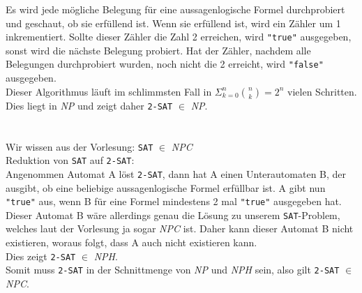 \documentclass{article}
\begin{document}
Es wird jede mögliche Belegung für eine aussagenlogische Formel durchprobiert und geschaut, ob sie erfüllend ist.
Wenn sie erfüllend ist, wird ein Zähler um 1 inkrementiert.
Sollte dieser Zähler die Zahl 2 erreichen, wird \texttt{"true"} ausgegeben, sonst wird die nächste Belegung probiert.
Hat der Zähler, nachdem alle Belegungen durchprobiert wurden, noch nicht die 2 erreicht, wird \texttt{"false"} ausgegeben.\\
Dieser Algorithmus läuft im schlimmsten Fall in $\Sigma ^n_{k=0} \binom{n}{k} = 2^n$ vielen Schritten.\\
Dies liegt in \textit{NP} und zeigt daher \texttt{2-SAT} $\in$ \textit{NP}.\\
\\
\\
Wir wissen aus der Vorlesung: \texttt{SAT} $\in$ \textit{NPC}\\
Reduktion von \texttt{SAT} auf \texttt{2-SAT}:\\
Angenommen Automat A löst \texttt{2-SAT}, dann hat A einen Unterautomaten B, der ausgibt, ob eine beliebige aussagenlogische Formel erfüllbar ist.
A gibt nun \texttt{"true"} aus, wenn B für eine Formel mindestens 2 mal \texttt{"true"} ausgegeben hat.\\
Dieser Automat B wäre allerdings genau die Lösung zu unserem \texttt{SAT}-Problem, welches laut der Vorlesung ja sogar \textit{NPC} ist.
Daher kann dieser Automat B nicht existieren, woraus folgt, dass A auch nicht existieren kann.\\
Dies zeigt \texttt{2-SAT} $\in$ \textit{NPH}.\\
Somit muss \texttt{2-SAT} in der Schnittmenge von \textit{NP} und \textit{NPH} sein, also gilt \texttt{2-SAT} $\in$ \textit{NPC}.
\end{document}
